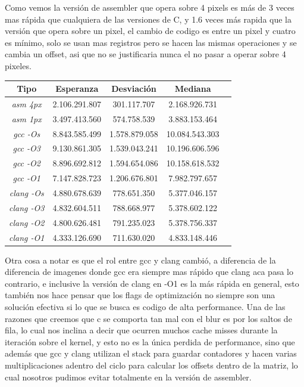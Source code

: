 \documentclass[a4paper]{article}
\begin{document}
Como vemos la versión de assembler que opera sobre 4 pixels es más de 3 veces mas rápida que cualquiera de las versiones de C, y 1.6 veces más rapida que la versión que opera sobre un pixel, el cambio de codigo es entre un pixel y cuatro es mínimo, solo se usan mas registros pero se hacen las mismas operaciones y se cambia un offset, asi que no se justificaria nunca el no pasar a operar sobre 4 pixeles.


\begin{center}

        \begin{tabular}[c]{|c|c|c|c|c|}
    \hline
        \textbf{Tipo}  & \textbf{Esperanza} & \textbf{Desviación} & \textbf{Mediana}\\
        \hline
\textit{asm 4px} &	2.106.291.807 & 301.117.707 & 2.168.926.731 \\
		\hline
\textit{asm 1px} &	3.497.413.560 & 574.758.539 & 3.883.153.464 \\
		\hline
\textit{gcc -Os} &	8.843.585.499 & 1.578.879.058 & 10.084.543.303  \\
		\hline
\textit{gcc -O3} &	9.130.861.305 & 1.539.043.241 & 10.196.606.596  \\
		\hline
\textit{gcc -O2} &	8.896.692.812 & 1.594.654.086 & 10.158.618.532  \\
		\hline
\textit{gcc -O1} &	7.147.828.723 & 1.206.676.801 & 7.982.797.657  \\
		\hline
\textit{clang -Os} & 4.880.678.639 & 778.651.350 & 5.377.046.157  \\
		\hline
\textit{clang -O3} &	4.832.604.511 & 788.668.977 & 5.378.602.122  \\
		\hline
\textit{clang -O2} &	4.800.626.481 & 791.235.023 & 5.378.756.337  \\
		\hline
\textit{clang -O1} &	4.333.126.690 & 711.630.020 & 4.833.148.446  \\
		\hline
	\end{tabular}
\end{center}

 Otra cosa a notar es que el rol entre gcc y clang cambió, a diferencia de la diferencia de imagenes donde gcc era siempre mas rápido que clang aca pasa lo contrario, e inclusive la versión de clang en -O1 es la más rápida en general, esto también nos hace pensar que los flags de optimización no siempre son una solución efectiva si lo que se busca es codigo de alta performance. Una de las razones que creemos que c se comporta tan mal con el blur es por los saltos de fila, lo cual nos inclina a decir que ocurren muchos cache misses durante la iteración sobre el kernel, y esto no es la única perdida de performance, sino que además que gcc y clang utilizan el stack para guardar contadores y hacen varias multiplicaciones adentro del ciclo para calcular los offsets dentro de la matriz, lo cual nosotros pudimos evitar totalmente en la versión de assembler. 
\end{document}
